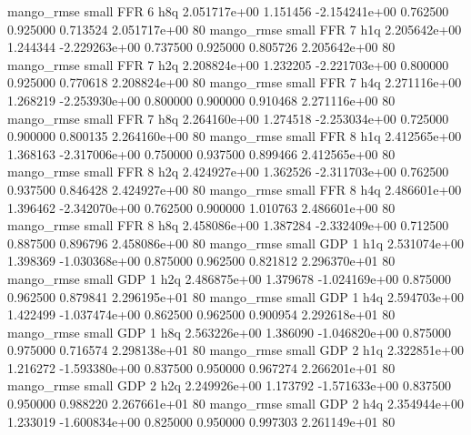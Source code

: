        mango_rmse      small      FFR                 6                  h8q 2.051717e+00      1.151456 -2.154241e+00 0.762500 0.925000       0.713524 2.051717e+00 80
       mango_rmse      small      FFR                 7                  h1q 2.205642e+00      1.244344 -2.229263e+00 0.737500 0.925000       0.805726 2.205642e+00 80
       mango_rmse      small      FFR                 7                  h2q 2.208824e+00      1.232205 -2.221703e+00 0.800000 0.925000       0.770618 2.208824e+00 80
       mango_rmse      small      FFR                 7                  h4q 2.271116e+00      1.268219 -2.253930e+00 0.800000 0.900000       0.910468 2.271116e+00 80
       mango_rmse      small      FFR                 7                  h8q 2.264160e+00      1.274518 -2.253034e+00 0.725000 0.900000       0.800135 2.264160e+00 80
       mango_rmse      small      FFR                 8                  h1q 2.412565e+00      1.368163 -2.317006e+00 0.750000 0.937500       0.899466 2.412565e+00 80
       mango_rmse      small      FFR                 8                  h2q 2.424927e+00      1.362526 -2.311703e+00 0.762500 0.937500       0.846428 2.424927e+00 80
       mango_rmse      small      FFR                 8                  h4q 2.486601e+00      1.396462 -2.342070e+00 0.762500 0.900000       1.010763 2.486601e+00 80
       mango_rmse      small      FFR                 8                  h8q 2.458086e+00      1.387284 -2.332409e+00 0.712500 0.887500       0.896796 2.458086e+00 80
       mango_rmse      small      GDP                 1                  h1q 2.531074e+00      1.398369 -1.030368e+00 0.875000 0.962500       0.821812 2.296370e+01 80
       mango_rmse      small      GDP                 1                  h2q 2.486875e+00      1.379678 -1.024169e+00 0.875000 0.962500       0.879841 2.296195e+01 80
       mango_rmse      small      GDP                 1                  h4q 2.594703e+00      1.422499 -1.037474e+00 0.862500 0.962500       0.900954 2.292618e+01 80
       mango_rmse      small      GDP                 1                  h8q 2.563226e+00      1.386090 -1.046820e+00 0.875000 0.975000       0.716574 2.298138e+01 80
       mango_rmse      small      GDP                 2                  h1q 2.322851e+00      1.216272 -1.593380e+00 0.837500 0.950000       0.967274 2.266201e+01 80
       mango_rmse      small      GDP                 2                  h2q 2.249926e+00      1.173792 -1.571633e+00 0.837500 0.950000       0.988220 2.267661e+01 80
       mango_rmse      small      GDP                 2                  h4q 2.354944e+00      1.233019 -1.600834e+00 0.825000 0.950000       0.997303 2.261149e+01 80
